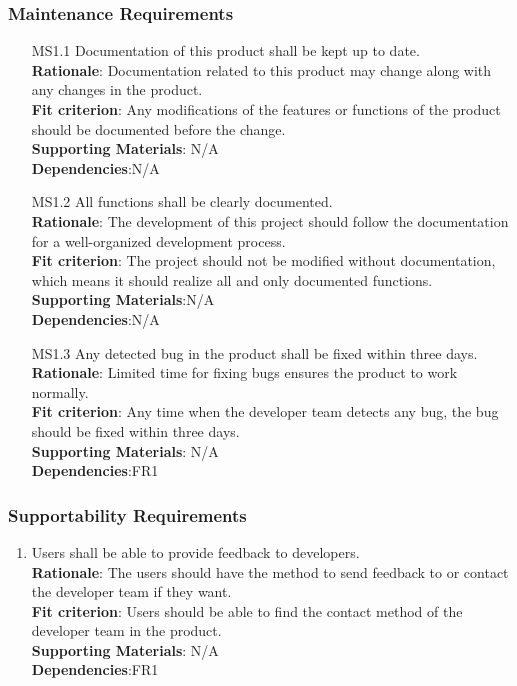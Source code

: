 \documentclass{article}
\begin{document}
\subsubsection{Maintenance Requirements}
\begin{enumerate}
    \item[MS1.1] Documentation of this product shall be kept up to date.\\
    \textbf{Rationale}: Documentation related to this product may change along with any changes in the product. \\
    \textbf{Fit criterion}: Any modifications of the features or functions
    of the product should be documented before the change.\\
\textbf{Supporting Materials}: N/A\\
\textbf{Dependencies}:N/A\\
    
    \item[MS1.2] All functions shall be clearly documented.\\
    \textbf{Rationale}: The development of this project should follow the documentation for a well-organized development process.\\
    \textbf{Fit criterion}: The project should not be modified without documentation, which means it should realize all and only documented functions.\\
\textbf{Supporting Materials}:N/A \\
\textbf{Dependencies}:N/A\\
    
    \item[MS1.3] Any detected bug in the product shall be fixed within three days.\\
    \textbf{Rationale}: Limited time for fixing bugs ensures the product to work normally.\\
    \textbf{Fit criterion}: Any time when the developer team detects any bug, the bug should be fixed within three days.\\
\textbf{Supporting Materials}: N/A\\
\textbf{Dependencies}:FR1\\

\end{enumerate}

\subsubsection{Supportability Requirements}
\begin{enumerate}[MS2.1]
    \item Users shall be able to provide
    feedback to developers.\\
    \textbf{Rationale}: The users should have the method to send feedback to or contact the developer
     team if they want. \\
    \textbf{Fit criterion}: Users should be able to find the contact method of the developer team in the product.\\
\textbf{Supporting Materials}: N/A\\
\textbf{Dependencies}:FR1\\

\end{enumerate}
\end{document}
